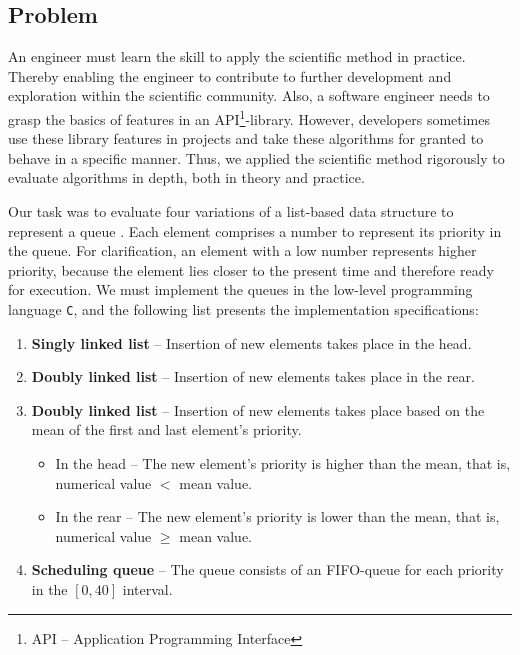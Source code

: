 \documentclass[a4paper,11pt]{kth-mag}
\newcommand*{\skippara}{\par\vspace{\baselineskip} \noindent}
\begin{document}
\subsection{Problem}\label{sec:problem}
\skippara An engineer must learn the skill to apply the scientific method in practice.
Thereby enabling the engineer to contribute to further development and exploration within the scientific community.
Also, a software engineer needs to grasp the basics of features in an API\footnote{API -- Application Programming Interface}-library.
However, developers sometimes use these library features in projects and take these algorithms for granted to behave in a specific manner.
Thus, we applied the scientific method rigorously to evaluate algorithms in depth, both in theory and practice.

\skippara Our task was to evaluate four variations of a list-based data structure to represent a queue \cite{Uppgiftl9:online}.
Each element comprises a number to represent its priority in the queue.
For clarification, an element with a low number represents higher priority, because the element lies closer to the present time and therefore ready for execution.
We must implement the queues in the low-level programming language \texttt{C}, and the following list presents the implementation specifications:
\begin{enumerate}
    \item \textbf{Singly linked list} -- Insertion of new elements takes place in the head.
    \item \textbf{Doubly linked list} -- Insertion of new elements takes place in the rear.
    \item \textbf{Doubly linked list} -- Insertion of new elements takes place based on the mean of the first and last element's priority.
        \begin{itemize}
            \item In the head -- The new element's priority is higher than the mean, that is, \\numerical value $<$ mean value.
            \item In the rear -- The new element's priority is lower than the mean, that is,\\numerical value $\ge$ mean value.
        \end{itemize}
    \item \textbf{Scheduling queue} -- The queue consists of an FIFO-queue for each priority in the $[0,40]$ interval.
\end{enumerate}
\end{document}
